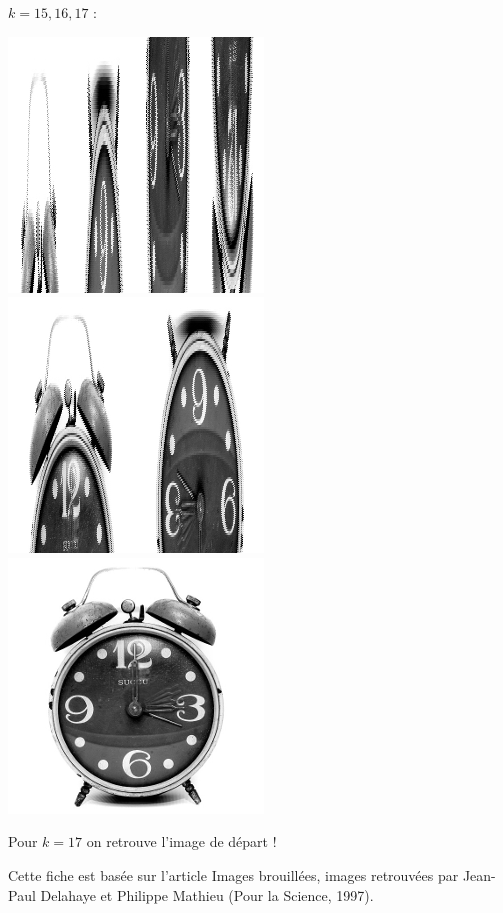 \documentclass[11pt,class=report,crop=false]{standalone}
\begin{document}
\begin{activite}
$k=15,16,17$ :
\begin{center}
\includegraphics[scale=\myscale,scale=0.4]{images_fiche/reveil_gimp_new_boul_15.png}\qquad
\includegraphics[scale=\myscale,scale=0.4]{images_fiche/reveil_gimp_new_boul_16.png}\qquad
\includegraphics[scale=\myscale,scale=0.4]{images_fiche/reveil_gimp_new_boul_17.png}
\end{center}

Pour $k=17$ on retrouve l'image de départ !

\end{activite}


Cette fiche est basée sur l'article \og{}Images brouillées, images retrouvées\fg{} par Jean-Paul Delahaye et Philippe Mathieu (Pour la Science, 1997).
\end{document}
